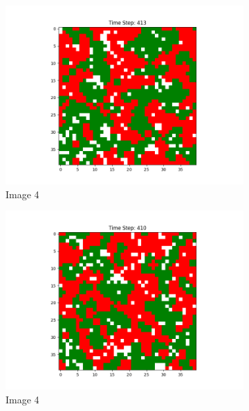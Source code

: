 \documentclass[12pt]{article}
\begin{document}
\begin{figure}[h]
\begin{subfigure}{0.2\textwidth}
			\includegraphics[width=\linewidth]{final_social_n10p3.png}
			\caption{Image 4}
		\end{subfigure}\hspace{0.02\textwidth}
		\begin{subfigure}{0.2\textwidth}
			\includegraphics[width=\linewidth]{final_social_n10p5.png}
			\caption{Image 4}
		\end{subfigure}\hspace{0.02\textwidth}
		\begin{subfigure}{0.2\textwidth}

\end{subfigure}
\end{figure}
\end{document}

